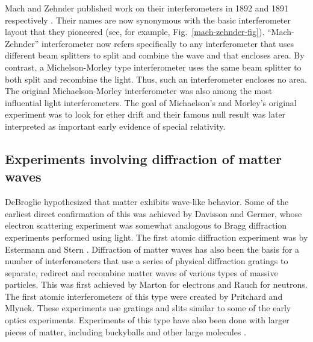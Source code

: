 Mach and Zehnder published work on their interferometers in 1892 and 1891 respectively \cite{mach}\cite{zehnder}. Their names are now synonymous with the basic interferometer layout that they pioneered (see, for example, Fig.~\ref{mach-zehnder-fig}).  ``Mach-Zehnder'' interferometer now refers specifically to any interferometer that uses different beam splitters to split and combine the wave and that encloses area. By contrast, a Michelson-Morley type interferometer uses the same beam splitter to both split and recombine the light. Thus, such an interferometer encloses no area. 
The original Michaelson-Morley interferometer was also among the most influential light interferometers. The goal of Michaelson's and Morley's original experiment was to look for ether drift and their famous null result was later interpreted as important early evidence of special relativity.

\subsection{Experiments involving diffraction of matter waves}
DeBroglie hypothesized that matter exhibits wave-like behavior. Some of the earliest direct confirmation of this was achieved by Davisson and Germer\cite{davisson_and_germer}, whose electron scattering experiment was somewhat analogous to Bragg diffraction experiments performed using light. The first atomic diffraction experiment was by Estermann and Stern \cite{esterman_stern,Kronin_RMP}. Diffraction of matter waves has also been the basis for a number of interferometers that use a series of physical diffraction gratings to separate, redirect and recombine matter waves of various types of massive particles. This was first achieved by Marton\cite{electronGrating} for electrons and Rauch\cite{neutronGrating} for neutrons. The first atomic interferometers of this type were created by Pritchard\cite{pritchard1991} and Mlynek\cite{youngDoubleSlit_Carnal_Mlynek}. These experiments use gratings and slits similar to some of the early optics experiments. Experiments of this type have also been done with larger pieces of matter, including buckyballs\cite{C60_interferometry} and other large molecules \cite{large_molecule_interferometry}.

